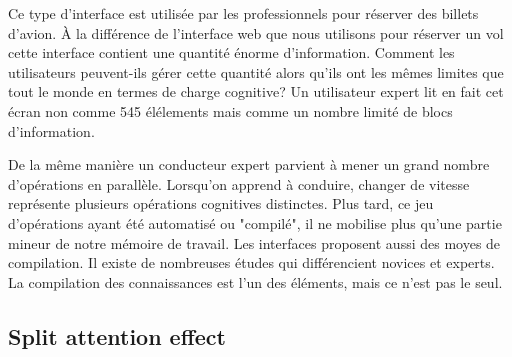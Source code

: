 \begin{figure}[H]
\centering
{}
\end{figure}

Ce type d'interface est utilis\'ee par les professionnels pour r\'eserver des billets d'avion. \`A la diff\'erence de l'interface web que nous utilisons pour r\'eserver un vol cette interface contient une quantit\'e \'enorme d'information. Comment les utilisateurs peuvent-ils g\'erer cette quantit\'e alors qu'ils ont les m\^emes limites que tout le monde en termes de charge cognitive? Un utilisateur expert lit en fait cet \'ecran non comme 545 \'el\'elements mais comme un nombre limit\'e de blocs d'information.

De la m\^eme mani\`ere un conducteur expert parvient \`a mener un grand nombre d'op\'erations en parall\`ele. Lorsqu'on apprend \`a conduire, changer de vitesse repr\'esente plusieurs op\'erations cognitives distinctes. Plus tard, ce jeu d'op\'erations ayant \'et\'e automatis\'e ou "compil\'e", il ne mobilise plus qu'une partie mineur de notre m\'emoire de travail. Les interfaces proposent aussi des moyes de compilation. Il existe de nombreuses \'etudes qui diff\'erencient novices et experts. La compilation des connaissances est l'un des \'el\'ements, mais ce n'est pas le seul.

\subsection{Split attention effect}

